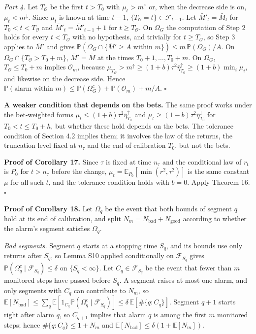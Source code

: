 \documentclass[
]{article}
\begin{document}
\emph{Part 4.} Let \(T_{\mathcal{O}}\) be the first \(t > T_0\) with
\(\mu_t > m^{\uparrow}\) or, when the decrease side is on,
\(\mu_t < m^{\downarrow}\). Since \(\mu_t\) is known at time \(t - 1\),
\(\lbrace T_{\mathcal{O}} = t\rbrace \in \mathcal{F}_{t-1}\). Let
\(\bar M'_t = \bar M_t\) for \(T_0 < t < T_{\mathcal{O}}\) and
\(\bar M'_t = \bar M'_{t-1} + 1\) for \(t \ge T_{\mathcal{O}}\). On
\(\Omega_G\) the computation of Step 2 holds for every
\(t < T_{\mathcal{O}}\) with no hypothesis, and trivially for
\(t \ge T_{\mathcal{O}}\), so Step 3 applies to \(\bar M'\) and gives
\(\mathbb{P}(\Omega_G \cap \lbrace \bar M' \ge A \text{ within } m\rbrace) \le m\,\mathbb{P}(\Omega_G)/A\).
On \(\Omega_G \cap \lbrace T_{\mathcal{O}} > T_0 + m\rbrace\),
\(\bar M' = \bar M\) at the times \(T_0 + 1, \dots, T_0 + m\). On
\(\Omega_G\), \(T_{\mathcal{O}} \le T_0 + m\) implies \(\mathcal{O}_m\),
because
\(\mu_{T_{\mathcal{O}}} > m^{\uparrow} \ge (1+b)\tau^2\bar\eta^{\uparrow}_{T_0} \ge (1+b)\min_i\mu_i\),
and likewise on the decrease side. Hence
\(\mathbb{P}(\text{alarm within } m) \le \mathbb{P}(\Omega_G^c) + \mathbb{P}(\mathcal{O}_m) + m/A\).
\(\square\)

\textbf{A weaker condition that depends on the bets.} The same proof
works under the bet-weighted forms
\(\mu_t \le (1+b)\tau^2\bar\eta^{\uparrow}_{T_0}\) and
\(\mu_t \ge (1-b)\tau^2\bar\eta^{\downarrow}_{T_0}\) for
\(T_0 < t \le T_0 + h\), but whether these hold depends on the bets. The
tolerance condition of Section 4.2 implies them; it involves the law of
the returns, the truncation level fixed at \(n_\tau\) and the end of
calibration \(T_0\), but not the bets.

\textbf{Proof of Corollary 17.} Since \(\tau\) is fixed at time
\(n_\tau\) and the conditional law of \(r_t\) is \(P_0\) for
\(t > n_\tau\) before the change,
\(\mu_t = \mathbb{E}_{P_0}[\min(r^2, \tau^2)]\) is the same constant
\(\mu\) for all such \(t\), and the tolerance condition holds with
\(b = 0\). Apply Theorem 16. \(\square\)

\textbf{Proof of Corollary 18.} Let \(\Omega_q\) be the event that both
bounds of segment \(q\) hold at its end of calibration, and split
\(N_m = N_{\mathrm{bad}} + N_{\mathrm{good}}\) according to whether the
alarm's segment satisfies \(\Omega_q\).

\emph{Bad segments.} Segment \(q\) starts at a stopping time \(S_q\),
and its bounds use only returns after \(S_q\), so Lemma S10 applied
conditionally on \(\mathcal{F}_{S_q}\) gives
\(\mathbb{P}(\Omega_q^c \mid \mathcal{F}_{S_q}) \le \delta\) on
\(\lbrace S_q < \infty\rbrace\). Let \(C_q \in \mathcal{F}_{S_q}\) be
the event that fewer than \(m\) monitored steps have passed before
\(S_q\). A segment raises at most one alarm, and only segments with
\(C_q\) can contribute to \(N_m\), so
\(\mathbb{E}[N_{\mathrm{bad}}] \le \sum_q \mathbb{E}[1_{C_q}\mathbb{P}(\Omega_q^c \mid \mathcal{F}_{S_q})] \le \delta\,\mathbb{E}[\#\lbrace q : C_q\rbrace]\).
Segment \(q+1\) starts right after alarm \(q\), so \(C_{q+1}\) implies
that alarm \(q\) is among the first \(m\) monitored steps; hence
\(\#\lbrace q : C_q\rbrace \le 1 + N_m\) and
\(\mathbb{E}[N_{\mathrm{bad}}] \le \delta(1 + \mathbb{E}[N_m])\).
\end{document}
